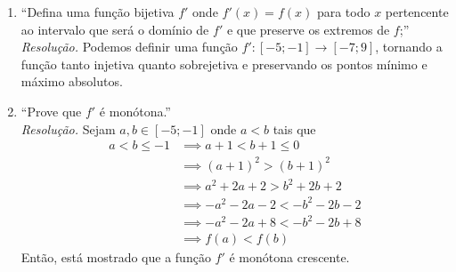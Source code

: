 \begin{enumerate}
    \item \enquote{Defina uma função bijetiva $f'$ onde $f'(x) = f(x)$ para todo $x$ pertencente ao intervalo que será o domínio de $f'$ e que preserve os extremos de $f$;} \\
    \emph{Resolução.} Podemos definir uma função $f': [-5; -1] \rightarrow [-7; 9]$, tornando a função tanto injetiva quanto sobrejetiva e preservando os pontos mínimo e máximo absolutos.
    \item \enquote{Prove que $f'$ é monótona.} \\
    \emph{Resolução.} Sejam $a, b \in [-5; -1]$ onde $a < b$ tais que
    \begin{align*}
        a < b \le -1 & \implies a + 1 < b + 1 \le 0 \\ & \implies
        (a + 1)^2 > (b + 1)^2 \\ & \implies
        a^2 + 2a +2 > b^2 + 2b + 2 \\ & \implies
        -a^2 - 2a - 2 < -b^2 - 2b - 2 \\ & \implies 
        -a^2 - 2a + 8 < -b^2 - 2b + 8 \\ & \implies
        f(a) < f(b) 
    \end{align*}
    Então, está mostrado que a função $f'$ é monótona crescente.
\end{enumerate}
